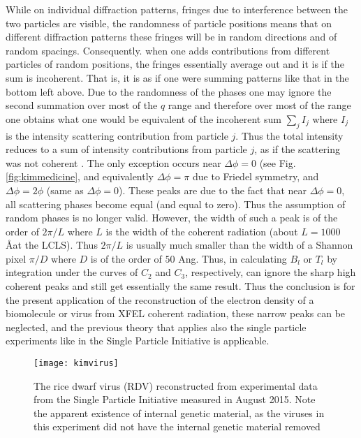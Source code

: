 While on individual diffraction patterns, fringes due to interference between the two particles are visible, the randomness of particle positions means that on different diffraction patterns these fringes will be in random directions and of random spacings. Consequently. when one adds contributions from different particles of random positions, the fringes essentially average out and it is if the sum is incoherent. That is, it is as if one were summing patterns like that in the bottom left above. Due to the randomness of the phases one may ignore the second summation over most of the $q$ range and therefore over most of the range one obtains what one would be equivalent of the incoherent sum $\sum_{j} I_j$ where $I_j$ is the intensity scattering contribution from particle $j$. Thus the total intensity reduces to a sum of intensity contributions from particle $j$, as if the scattering was not coherent \cite{kimmedicine}. The only exception occurs near $\Delta \phi =0$ (see Fig. \ref{fig:kimmedicine}, and equivalently $\Delta \phi =\pi $ due to Friedel symmetry, and $\Delta \phi = 2 \phi$ (same as $\Delta \phi =0$). These peaks are due to the fact that near $\Delta \phi =0$, all scattering phases become equal (and equal to zero). Thus the assumption of random phases is no longer valid. However, the width of such a peak is of the order of $2 \pi/L$ where $L$ is the width of the coherent radiation (about $L=1000$ \AA at the LCLS). Thus $2 \pi /L$ is usually much smaller than the width of a Shannon pixel $\pi /D$ where $D$ is of the order of $50$ Ang. Thus, in calculating $B_l$  or $T_l$  by integration under the curves of $C_2$ and $C_3$, respectively, can ignore the sharp high coherent peaks and still get essentially the same result. Thus the conclusion is for the present application of the reconstruction of the electron density of a biomolecule or virus from XFEL coherent radiation, these narrow peaks can be neglected, and the previous theory \cite{saldin2009} that applies also the single particle experiments like in the Single Particle Initiative \cite{Munke} is applicable.
\begin{figure}[ht]
  \centering
  \texttt{[image: kimvirus]}
\caption{The rice dwarf virus (RDV) 
reconstructed from experimental data from 
the Single Particle Initiative measured in August 
2015. Note the apparent existence of internal 
genetic material, as the viruses in this 
experiment did not have the internal genetic 
material removed
}
\label{fig:kimvirus}
\end{figure}

